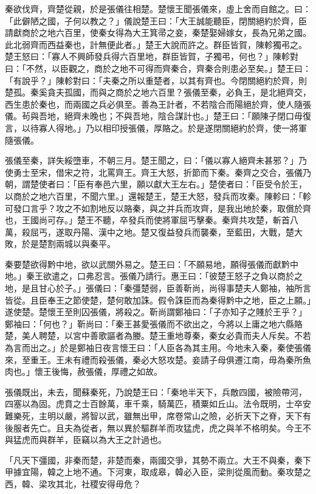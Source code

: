 \begin{pinyinscope}
秦欲伐齊，齊楚從親，於是張儀往相楚。楚懷王聞張儀來，虛上舍而自館之。曰：「此僻陋之國，子何以教之？」儀說楚王曰：「大王誠能聽臣，閉關絕約於齊，臣請獻商於之地六百里，使秦女得為大王箕帚之妾，秦楚娶婦嫁女，長為兄弟之國。此北弱齊而西益秦也，計無便此者。」楚王大說而許之。群臣皆賀，陳軫獨弔之。楚王怒曰：「寡人不興師發兵得六百里地，群臣皆賀，子獨弔，何也？」陳軫對曰：「不然，以臣觀之，商於之地不可得而齊秦合，齊秦合則患必至矣。」楚王曰：「有說乎？」陳軫對曰：「夫秦之所以重楚者，以其有齊也。今閉關絕約於齊，則楚孤。秦奚貪夫孤國，而與之商於之地六百里？張儀至秦，必負王，是北絕齊交，西生患於秦也，而兩國之兵必俱至。善為王計者，不若陰合而陽絕於齊，使人隨張儀。茍與吾地，絕齊未晚也；不與吾地，陰合謀計也。」楚王曰：「願陳子閉口毋復言，以待寡人得地。」乃以相印授張儀，厚賂之。於是遂閉關絕約於齊，使一將軍隨張儀。

張儀至秦，詳失綏墮車，不朝三月。楚王聞之，曰：「儀以寡人絕齊未甚邪？」乃使勇士至宋，借宋之符，北罵齊王。齊王大怒，折節而下秦。秦齊之交合，張儀乃朝，謂楚使者曰：「臣有奉邑六里，願以獻大王左右。」楚使者曰：「臣受令於王，以商於之地六百里，不聞六里。」還報楚王，楚王大怒，發兵而攻秦。陳軫曰：「軫可發口言乎？攻之不如割地反以賂秦，與之并兵而攻齊，是我出地於秦，取償於齊也，王國尚可存。」楚王不聽，卒發兵而使將軍屈丐擊秦。秦齊共攻楚，斬首八萬，殺屈丐，遂取丹陽、漢中之地。楚又復益發兵而襲秦，至藍田，大戰，楚大敗，於是楚割兩城以與秦平。

秦要楚欲得黔中地，欲以武關外易之。楚王曰：「不願易地，願得張儀而獻黔中地。」秦王欲遣之，口弗忍言。張儀乃請行。惠王曰：「彼楚王怒子之負以商於之地，是且甘心於子。」張儀曰：「秦彊楚弱，臣善靳尚，尚得事楚夫人鄭袖，袖所言皆從。且臣奉王之節使楚，楚何敢加誅。假令誅臣而為秦得黔中之地，臣之上願。」遂使楚。楚懷王至則囚張儀，將殺之。靳尚謂鄭袖曰：「子亦知子之賤於王乎？」鄭袖曰：「何也？」靳尚曰：「秦王甚愛張儀而不欲出之，今將以上庸之地六縣賂楚，美人聘楚，以宮中善歌謳者為媵。楚王重地尊秦，秦女必貴而夫人斥矣。不若為言而出之。」於是鄭袖日夜言懷王曰：「人臣各為其主用。今地未入秦，秦使張儀來，至重王。王未有禮而殺張儀，秦必大怒攻楚。妾請子母俱遷江南，毋為秦所魚肉也。」懷王後悔，赦張儀，厚禮之如故。

張儀既出，未去，聞蘇秦死，乃說楚王曰：「秦地半天下，兵敵四國，被險帶河，四塞以為固。虎賁之士百餘萬，車千乘，騎萬匹，積粟如丘山。法令既明，士卒安難樂死，主明以嚴，將智以武，雖無出甲，席卷常山之險，必折天下之脊，天下有後服者先亡。且夫為從者，無以異於驅群羊而攻猛虎，虎之與羊不格明矣。今王不與猛虎而與群羊，臣竊以為大王之計過也。

「凡天下彊國，非秦而楚，非楚而秦，兩國交爭，其勢不兩立。大王不與秦，秦下甲據宜陽，韓之上地不通。下河東，取成皋，韓必入臣，梁則從風而動。秦攻楚之西，韓、梁攻其北，社稷安得毋危？


\end{pinyinscope}

